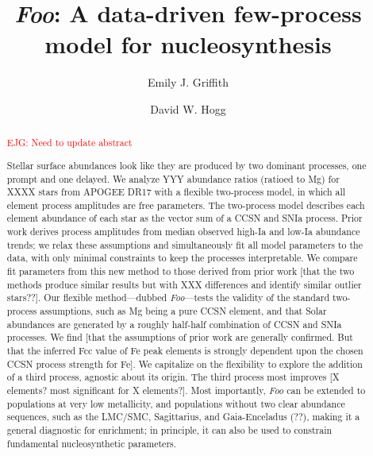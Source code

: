 \documentclass[modern]{aastex631}
\newcommand{\ejg}[1]{\textcolor{red}{EJG: #1}}
\newcommand{\name}{\textsl{Foo}} %
\begin{document}
\title{\name: A data-driven few-process model for nucleosynthesis}


\author[0000-0001-9345-9977]{Emily J. Griffith}

\author[0000-0003-2866-9403]{David W. Hogg}


\begin{abstract}\noindent %

\ejg{Need to update abstract}

Stellar surface abundances look like they are produced by two dominant processes, one prompt and one delayed.
We analyze YYY abundance ratios (ratioed to Mg) for XXXX stars from APOGEE DR17 with a flexible two-process model, in which all element process amplitudes are free parameters.
The two-process model describes each element abundance of each star as the vector sum of a CCSN and SNIa process.
Prior work derives process amplitudes from median observed high-Ia and low-Ia abundance trends; we relax these assumptions and simultaneously fit all model parameters to the data, with only minimal constraints to keep the processes interpretable.
We compare fit parameters from this new method to those derived from prior work [that the two methods produce similar results but with XXX differences and identify similar outlier stars??].
Our flexible method---dubbed \name---tests the validity of the standard two-process assumptions, such as Mg being a pure CCSN element, and that Solar abundances are generated by a roughly half-half combination of CCSN and SNIa processes.
We find [that the assumptions of prior work are generally confirmed. But that the inferred Fcc value of Fe peak elements is strongly dependent upon the chosen CCSN process strength for Fe].
We capitalize on the flexibility to explore the addition of a third process, agnostic about its origin.
The third process most improves [X elements? most significant for X elements?].
Most importantly, \name{} can be extended to populations at very low metallicity, and populations without two clear abundance sequences, such as the LMC/SMC, Sagittarius, and Gaia-Enceladus (??), making it a general diagnostic for enrichment; in principle, it can also be used to constrain fundamental nucleosynthetic parameters.
\end{abstract}
\end{document}
